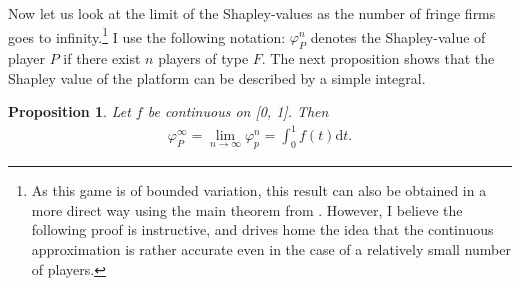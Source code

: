 \documentclass[a4paper]{article}
\newtheorem{proposition}{Proposition}
\newcommand{\dt}{\mathrm{d}t}
\begin{document}
Now let us look at the limit of the Shapley-values as the number of fringe firms goes to infinity.\footnote{
    As this game is of bounded variation, this result can also be obtained in a more direct way using the main theorem from \textcite{fogelman1980asymptotic}.
    However, I believe the following proof is instructive, and drives home the idea that the continuous approximation is rather accurate even in the case of a relatively small number of players.
}
I use the following notation: $\varphi_P^n$ denotes the Shapley-value of player $P$ if there exist $n$ players of type $F$.
The next proposition shows that the Shapley value of the platform can be described by a simple integral.

\begin{proposition}
    \label{prop:one_sided}
    Let $f$ be continuous on [0, 1]. Then
    \begin{align*}
        \varphi_P^\infty = \lim_{n \to \infty} \varphi_p^n = \int_0^1 f(t) \dt .
    \end{align*}
\end{proposition}
\end{document}
